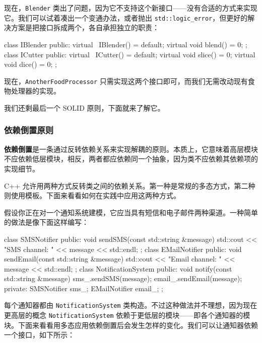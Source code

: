 \label{idx:052}
现在，\texttt{Blender} 类出了问题，因为它不支持这个新接口——没有合适的方式来实现它。我们可以试着凑出一个变通办法，或者抛出 \texttt{std::\allowbreak{}logic\_\allowbreak{}error}，但更好的解决方案是把接口拆成两个，各自承担独立的职责：

\begin{codebox}[cpp]
class IBlender {
public:
    virtual ~IBlender() = default;
    virtual void blend() = 0;
};
class ICutter {
public:
    virtual ~ICutter() = default;
    virtual void slice() = 0;
    virtual void dice() = 0;
};
\end{codebox}

\label{idx:053}
\label{idx:054}
现在，\texttt{Another\allowbreak{}Food\allowbreak{}Processor} 只需实现这两个接口即可，而我们无需改动现有食物处理器的实现。

我们还剩最后一个 SOLID 原则，下面就来了解它。

\subsubsection{依赖倒置原则}

\label{idx:055}
\label{idx:056}
\textbf{依赖倒置}是一条通过反转依赖关系来实现解耦的原则。本质上，它意味着高层模块不应依赖低层模块，相反，两者都应依赖同一个抽象，因为类不应依赖其依赖项的实现细节。

C++ 允许用两种方式反转类之间的依赖关系。第一种是常规的多态方式，第二种则使用模板。下面来看看如何在实践中应用这两种方式。

假设你正在对一个通知系统建模，它应当具有短信和电子邮件两种渠道。一种简单的做法是像下面这样编写：

\begin{codebox}[cpp]
class SMSNotifier {
public:
    void sendSMS(const std::string &message) {
        std::cout << "SMS channel: " << message << std::endl;
    }
};
class EMailNotifier {
public:
    void sendEmail(const std::string &message) {
        std::cout << "Email channel: " << message << std::endl;
    }
};
class NotificationSystem {
public:
    void notify(const std::string &message) {
        sms_.sendSMS(message);
        email_.sendEmail(message);
    }
private:
    SMSNotifier sms_;
    EMailNotifier email_;
};
\end{codebox}

\label{idx:057}
\label{idx:058}
每个通知器都由 \texttt{Notification\allowbreak{}System} 类构造。不过这种做法并不理想，因为现在更高层的概念 \texttt{Notification\allowbreak{}System} 依赖于更低层的模块——即各个通知器的模块。下面来看看用多态应用依赖倒置后会发生怎样的变化。我们可以让通知器依赖一个接口，如下所示：

